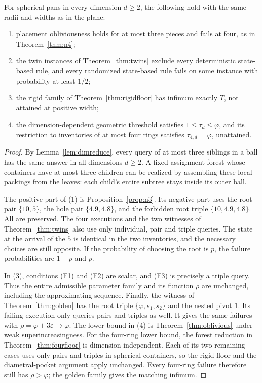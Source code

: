 \begin{corollary}\label{cor:dimsharp}
For spherical pans in every dimension $d\ge2$, the following hold with
the same radii and widths as in the plane:
\begin{enumerate}
\item placement obliviousness holds for at most three pieces and fails
  at four, as in Theorem~\ref{thm:n4};
\item the twin instances of Theorem~\ref{thm:twins} exclude every
  deterministic state-based rule, and every randomized state-based
  rule fails on some instance with probability at least $1/2$;
\item the rigid family of Theorem~\ref{thm:rigidfloor} has infimum
  exactly $T$, not attained at positive width;
\item the dimension-dependent geometric threshold satisfies
  $1\le\tau_d\le\varphi$, and its restriction to inventories of
  at most four rings satisfies $\tau_{4,d}=\varphi$, unattained.
\end{enumerate}
\end{corollary}
\begin{proof}
By Lemma~\ref{lem:dimreduce}, every query of at most three siblings
in a ball has the same answer in all dimensions $d\ge2$. A fixed
assignment forest whose containers have at most three children can
be realized by assembling these local packings from the leaves:
each child's entire subtree stays inside its outer ball.

The positive part of (1) is Proposition~\ref{prop:n3}. Its negative
part uses the root pair $\{10,5\}$, the hole pair $\{4.9,4.8\}$,
and the forbidden root triple $\{10,4.9,4.8\}$. All are preserved.
The four executions and the two witnesses of Theorem~\ref{thm:twins}
also use only individual, pair and triple queries. The state at the
arrival of the $5$ is identical in the two inventories, and the
necessary choices are still opposite. If the probability of choosing
the root is $p$, the failure probabilities are $1-p$ and $p$.

In (3), conditions (F1) and (F2) are scalar, and (F3) is precisely
a triple query. Thus the entire admissible parameter family and its
function $\rho$ are unchanged, including the approximating sequence.
Finally, the witness of Theorem~\ref{thm:golden} has the root triple
$\{\varphi,s_1,s_2\}$ and the nested pivot $1$. Its failing execution
only queries pairs and triples as well. It gives the same failures
with $\rho=\varphi+3\varepsilon\to\varphi$. The lower bound in (4)
is Theorem~\ref{thm:oblivious} under weak superincreasingness.
For the four-ring lower bound, the forest reduction in
Theorem~\ref{thm:fourfloor} is dimension-independent. Each of its
two remaining cases uses only pairs and triples in spherical
containers, so the rigid floor and the diametral-pocket argument
apply unchanged. Every four-ring failure therefore still has
$\rho>\varphi$; the golden family gives the matching infimum.
\end{proof}


